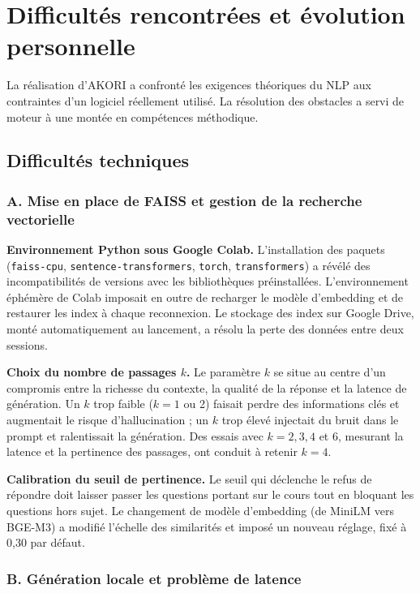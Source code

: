 \documentclass[12pt,a4paper,oneside]{report}
\begin{document}
\section{Difficultés rencontrées et évolution personnelle}

La réalisation d'AKORI a confronté les exigences théoriques du NLP aux contraintes d'un logiciel réellement utilisé. La résolution des obstacles a servi de moteur à une montée en compétences méthodique.

\subsection{Difficultés techniques}

\subsubsection*{A. Mise en place de FAISS et gestion de la recherche vectorielle}

\textbf{Environnement Python sous Google Colab.} L'installation des paquets (\texttt{faiss-cpu}, \texttt{sentence-transformers}, \texttt{torch}, \texttt{transformers}) a révélé des incompatibilités de versions avec les bibliothèques préinstallées. L'environnement éphémère de Colab imposait en outre de recharger le modèle d'embedding et de restaurer les index à chaque reconnexion. Le stockage des index sur Google Drive, monté automatiquement au lancement, a résolu la perte des données entre deux sessions.

\textbf{Choix du nombre de passages $k$.} Le paramètre $k$ se situe au centre d'un compromis entre la richesse du contexte, la qualité de la réponse et la latence de génération. Un $k$ trop faible ($k = 1$ ou 2) faisait perdre des informations clés et augmentait le risque d'hallucination ; un $k$ trop élevé injectait du bruit dans le prompt et ralentissait la génération. Des essais avec $k = 2, 3, 4$ et 6, mesurant la latence et la pertinence des passages, ont conduit à retenir $k = 4$.

\textbf{Calibration du seuil de pertinence.} Le seuil qui déclenche le refus de répondre doit laisser passer les questions portant sur le cours tout en bloquant les questions hors sujet. Le changement de modèle d'embedding (de MiniLM vers BGE-M3) a modifié l'échelle des similarités et imposé un nouveau réglage, fixé à 0,30 par défaut.

\subsubsection*{B. Génération locale et problème de latence}
\end{document}
